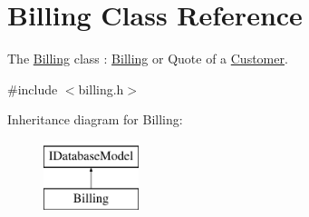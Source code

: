 \hypertarget{classBilling}{\section{Billing Class Reference}
\label{classBilling}
}


The \hyperlink{classBilling}{Billing} class \+: \hyperlink{classBilling}{Billing} or Quote of a \hyperlink{classCustomer}{Customer}.  




{\ttfamily \#include $<$billing.\+h$>$}

Inheritance diagram for Billing\+:\begin{figure}[H]
\begin{center}
\leavevmode
\includegraphics[height=2.000000cm]{df/d81/classBilling}
\end{center}
\end{figure}
